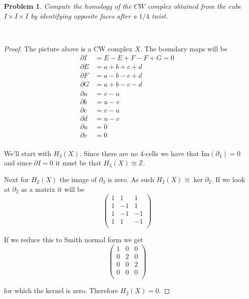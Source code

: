 \documentclass[10pt]{article}
\newcommand{\sk}{\vskip 10mm}
\newcommand{\bb}[1]{\mathbb{#1}}
\theoremstyle{plain}
\newtheorem{problem}{Problem}
\theoremstyle{remark}
\begin{document}
\sk

\begin{problem}
  Compute the homology of the $CW$ complex obtained from the cube
  $I\times I\times I$ by identifying opposite faces after a $1/4$ twist.
\end{problem}

\newpage
\ 
\vskip3in

\begin{proof}
  The picture above is a CW complex $X$. The boundary maps
  will be
  \begin{align*}
    \partial I&= E-E+F-F+G=0\\
    \partial E&= a+b+c+d\\
    \partial F&= a-b-c+d\\
    \partial G&= a+b-c-d\\
    \partial a&= v-u\\
    \partial b&= u-v\\
    \partial c&= v-u\\
    \partial d&= u-v\\
    \partial u&= 0\\
    \partial v&= 0\\
  \end{align*}

  We'll start with $H_3(X)$. Since there are no 4-cells we have that
  $\mathrm{Im}(\partial_4)=0$ and since $\partial I=0$ it must be that $H_3(X)\cong\bb{Z}$.

  Next for $H_2(X)$ the image of $\partial_3$ is zero. As such $H_2(X)\cong \ker \partial_2$.
  If we look at $\partial_2$ as a matrix it will be
  \[
    \left(
      \begin{array}{rrr}
        1&1&1\\
        1&-1&1\\
        1&-1&-1\\
        1&1&-1\\
      \end{array}
    \right)
  \]

  If we reduce this to Smith normal form we get
  \[
    \left(
      \begin{array}{rrr}
        1&0&0\\
        0&2&0\\
        0&0&2\\
        0&0&0\\
      \end{array}
    \right)
  \]

  for which the kernel is zero. Therefore $H_2(X)=0$.


\end{proof}
\end{document}
